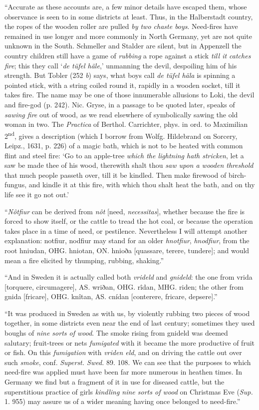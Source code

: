 \documentclass[a4paper, 11pt, oneside, polutonikogreek, english]{article}
\begin{document}
``Accurate as these accounts are, a few minor details have escaped them, whose observance is seen to in some districts at least. Thus, in the Halberstadt country, the ropes of the wooden roller are pulled \emph{by two chaste boys}. Need-fires have remained in use longer and more commonly in North Germany, yet are not quite unknown in the South. Schmeller and Stalder are silent, but in Appenzell the country children still have a game of \emph{rubbing} a rope against a stick \emph{till it catches fire}; this they call `\emph{de tüfel häle},' unmanning the devil, despoiling him of his strength. But Tobler (252 \emph{b}) says, what boys call \emph{de tüfel häla} is spinning a pointed stick, with a string coiled round it, rapidly in a wooden socket, till it takes fire. The name may be one of those innumerable allusions to Loki, the devil and fire-god (p. 242). Nic. Gryse, in a passage to be quoted later, speaks of \emph{sawing fire} out of wood, as we read elsewhere of symbolically sawing the old woman in two. The \emph{Practica} of Berthol. Carrichter, phys. in ord. to Maximilian 2\textsuperscript{nd}, gives a description (which I borrow from Wolfg. Hildebrand on Sorcery, Leipz., 1631, p. 226) of a magic bath, which is not to be heated with common flint and steel fire: `Go to an apple-tree \emph{which the lightning hath stricken}, let a saw be made thee of his wood, therewith shalt thou \emph{saw upon a wooden threshold} that much people passeth over, till it be kindled. Then make firewood of birch-fungus, and kindle it at this fire, with which thou shalt heat the bath, and on thy life see it go not out.'

``\emph{Nôtfiur} can be derived from \emph{nôt} [need, \emph{necessitas}], whether because the fire is forced to show itself, or the cattle to tread the hot coal, or because the operation takes place in a time of need, or pestilence. Nevertheless I will attempt another explanation: notfiur, nodfiur may stand for an older \emph{hnotfiur}, \emph{hnodfiur}, from the root hniudan, OHG. hniotan, ON. hnioða [quassare, terere, tundere]; and would mean a fire elicited by thumping, rubbing, shaking.''

``And in Sweden it is actually called both \emph{vrideld} and \emph{gnideld}: the one from vrida [torquere, circumagere], AS. wriðan, OHG. rîdan, MHG. riden; the other from gnida [fricare], OHG. knîtan, AS. cnídan [conterere, fricare, depsere].''

``It was produced in Sweden as with us, by violently rubbing two pieces of wood together, in some districts even near the end of last century; sometimes they used boughs of \emph{nine sorts of wood}. The smoke rising from gnideld was deemed salutary; fruit-trees or nets \emph{fumigated} with it became the more productive of fruit or fish. On this \emph{fumigation} with \emph{vriden eld}, and on driving the cattle out over such \emph{smoke}, conf. \emph{Superst. Swed.} 89. 108. We can see that the purposes to which need-fire was applied must have been far more numerous in heathen times. In Germany we find but a fragment of it in use for diseased cattle, but the superstitious practice of girls \emph{kindling nine sorts of wood} on Christmas Eve (\emph{Sup.} 1. 955) may assure us of a wider meaning having once belonged to need-fire.''
\end{document}
